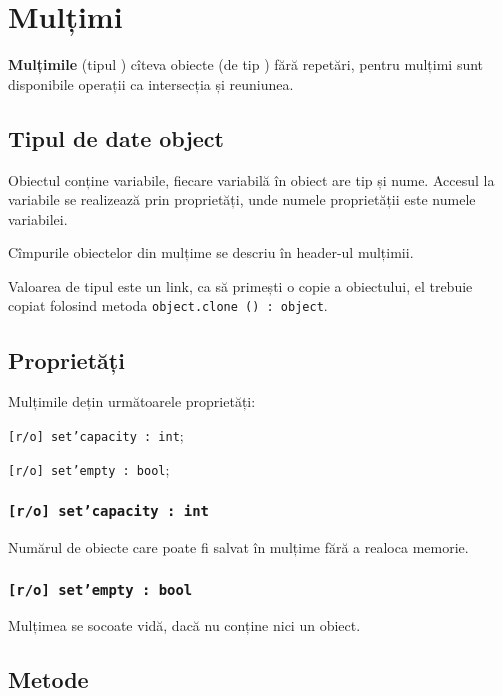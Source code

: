 \section{Mulțimi}

{\bf Mulțimile} (tipul \set) cîteva obiecte (de tip \object) fără repetări, pentru mulțimi sunt disponibile operații ca intersecția și reuniunea.

\subsection{Tipul de date object}

Obiectul conține variabile, fiecare variabilă în obiect are tip și nume. Accesul la variabile se realizează prin proprietăți, unde numele proprietății este numele variabilei.

Cîmpurile obiectelor din mulțime se descriu în header-ul mulțimii.

Valoarea de tipul \object{} este un link, ca să primești o copie a obiectului, el trebuie copiat folosind metoda \texttt{object.clone () : object}.

\subsection{Proprietăți}

Mulțimile dețin următoarele proprietăți:
\begin{icItems}
\item \texttt{[r/o] set'capacity : int};
\item \texttt{[r/o] set'empty : bool};
\end{icItems}

\subsubsection{\texttt{[r/o] set'capacity : int}}

Numărul de obiecte care poate fi salvat în mulțime fără a realoca memorie.

\subsubsection{\texttt{[r/o] set'empty : bool}}

Mulțimea se socoate vidă, dacă nu conține nici un obiect.

\subsection{Metode}

